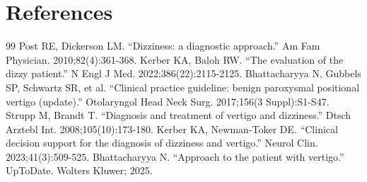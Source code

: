 \section*{References}
\begin{thebibliography}{99}
 Post RE, Dickerson LM. ``Dizziness: a diagnostic approach.'' Am Fam Physician. 2010;82(4):361-368.
 Kerber KA, Baloh RW. ``The evaluation of the dizzy patient.'' N Engl J Med. 2022;386(22):2115-2125.
 Bhattacharyya N, Gubbels SP, Schwartz SR, et al. ``Clinical practice guideline: benign paroxysmal positional vertigo (update).'' Otolaryngol Head Neck Surg. 2017;156(3 Suppl):S1-S47.
 Strupp M, Brandt T. ``Diagnosis and treatment of vertigo and dizziness.'' Dtsch Arztebl Int. 2008;105(10):173-180.
 Kerber KA, Newman-Toker DE. ``Clinical decision support for the diagnosis of dizziness and vertigo.'' Neurol Clin. 2023;41(3):509-525.
 Bhattacharyya N. ``Approach to the patient with vertigo.'' UpToDate. Wolters Kluwer; 2025.
\end{thebibliography}
